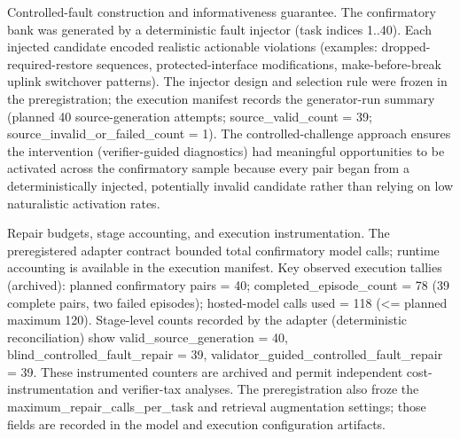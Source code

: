 \documentclass[conference]{IEEEtran}
\begin{document}
Controlled-fault construction and informativeness guarantee. The confirmatory bank was generated by a deterministic fault injector (task indices 1..40). Each injected candidate encoded realistic actionable violations (examples: dropped-required-restore sequences, protected-interface modifications, make-before-break uplink switchover patterns). The injector design and selection rule were frozen in the preregistration; the execution manifest records the generator-run summary (planned 40 source-generation attempts; source\_valid\_count = 39; source\_invalid\_or\_failed\_count = 1). The controlled-challenge approach ensures the intervention (verifier-guided diagnostics) had meaningful opportunities to be activated across the confirmatory sample because every pair began from a deterministically injected, potentially invalid candidate rather than relying on low naturalistic activation rates.

Repair budgets, stage accounting, and execution instrumentation. The preregistered adapter contract bounded total confirmatory model calls; runtime accounting is available in the execution manifest. Key observed execution tallies (archived): planned confirmatory pairs = 40; completed\_episode\_count = 78 (39 complete pairs, two failed episodes); hosted-model calls used = 118 (<= planned maximum 120). Stage-level counts recorded by the adapter (deterministic reconciliation) show valid\_source\_generation = 40, blind\_controlled\_fault\_repair = 39, validator\_guided\_controlled\_fault\_repair = 39. These instrumented counters are archived and permit independent cost-instrumentation and verifier-tax analyses. The preregistration also froze the maximum\_repair\_calls\_per\_task and retrieval augmentation settings; those fields are recorded in the model and execution configuration artifacts.
\end{document}
